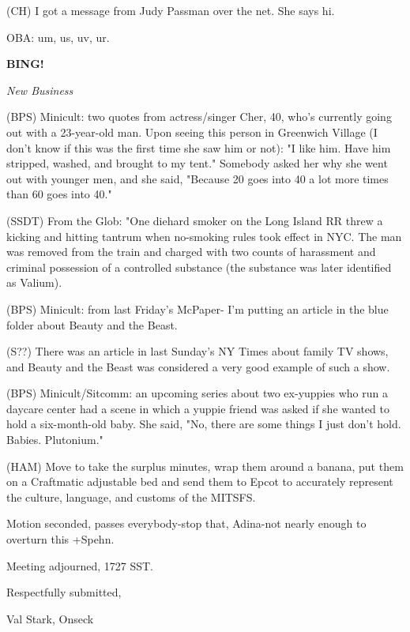 \documentclass[12pt]{article}
\newcommand{\bing}{{\bf BING!} }
\newcommand{\goto}[1]{\bing \vskip 12pt \centerline{{\em{#1}}}}
\begin{document}
(CH) I got a message from Judy Passman over the net. She says hi.

OBA: um, us, uv, ur.

\goto{New Business}

(BPS) Minicult: two quotes from actress/singer Cher, 40, who's currently going out with a 23-year-old man. Upon seeing this person in Greenwich Village (I don't know if this was the first time she saw him or not): "I like him. Have him stripped, washed, and brought to my tent." Somebody asked her why she went out with younger men, and she said, "Because 20 goes into 40 a lot more times than 60 goes into 40."

(SSDT) From the Glob: "One diehard smoker on the Long Island RR threw a kicking and hitting tantrum when no-smoking rules took effect in NYC. The man was removed from the train and charged with two counts of harassment and criminal possession of a controlled substance (the substance was later identified as Valium).

(BPS) Minicult: from last Friday's McPaper- I'm putting an article in the blue folder about Beauty and the Beast.

(S??) There was an article in last Sunday's NY Times about family TV shows, and Beauty and the Beast was considered a very good example of such a show.

(BPS) Minicult/Sitcomm: an upcoming series about two ex-yuppies who run a daycare center had a scene in which a yuppie friend was asked if she wanted to hold a six-month-old baby. She said, "No, there are some things I just don't hold. Babies. Plutonium."

(HAM) Move to take the surplus minutes, wrap them around a banana, put them on a Craftmatic adjustable bed and send them to Epcot to accurately represent the culture, language, and customs of the MITSFS.

Motion seconded, passes everybody-stop that, Adina-not nearly enough to overturn this +Spehn.

\vspace{12pt}

\noindent
Meeting adjourned, 1727 SST.

\vspace{18pt}

\centerline{Respectfully submitted,}
\centerline{Val Stark, Onseck}
\end{document}
